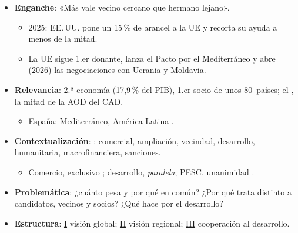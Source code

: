 \documentclass{article}
\begin{document}
\cabecerarepaso
\begin{columnas}

\begin{itemize}
\item \textbf{Enganche}: «Más vale vecino cercano que hermano lejano».
  \begin{itemize}
  \item 2025: EE.\,UU. pone un 15\,\% de arancel a la UE y recorta su ayuda a menos de la mitad.
  \item La UE sigue 1.er donante, lanza el Pacto por el Mediterráneo y abre (2026) las negociaciones con Ucrania y Moldavia.
  \end{itemize}
\item \textbf{Relevancia}: 2.ª economía (17,9\,\% del PIB), 1.er socio de unos 80~países; el , la mitad de la AOD del CAD.
  \begin{itemize}
  \item España: Mediterráneo, América Latina .
  \end{itemize}
\item \textbf{Contextualización}: : comercial, ampliación, vecindad, desarrollo, humanitaria, macrofinanciera, sanciones.
  \begin{itemize}
  \item Comercio, exclusivo ; desarrollo, \emph{paralela}; PESC, unanimidad .
  \end{itemize}
\item \textbf{Problemática}: ¿cuánto pesa y por qué en común? ¿Por qué trata distinto a candidatos, vecinos y socios? ¿Qué hace por el desarrollo?
\item \textbf{Estructura}: \hyperref[rep:I]{I} visión global; \hyperref[rep:II]{II} visión regional; \hyperref[rep:III]{III} cooperación al desarrollo.
\end{itemize}


\end{columnas}
\end{document}
